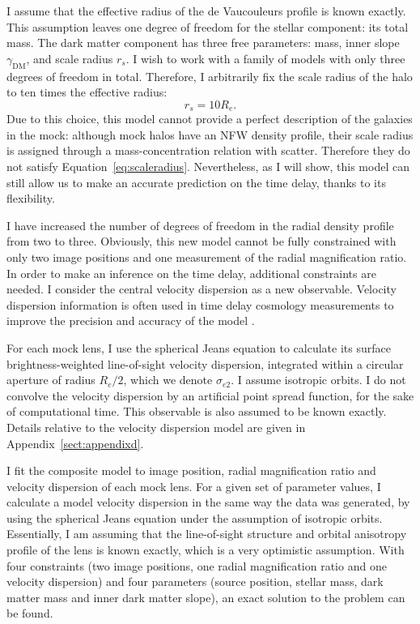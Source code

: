 \documentclass[usenatbib]{mnras}
\def\reff{R_e}
\def\sigmae{\sigma_{e2}}
\def\gammadm{\gamma_{\mathrm{DM}}}
\def\Eref#1{Equation~\ref{#1}\xspace}
\begin{document}
I assume that the effective radius of the de Vaucouleurs profile is known exactly.
This assumption leaves one degree of freedom for the stellar component: its total mass.
The dark matter component has three free parameters: mass, inner slope $\gammadm$, and scale radius $r_s$.
I wish to work with a family of models with only three degrees of freedom in total.
Therefore, I arbitrarily fix the scale radius of the halo to ten times the effective radius:
\begin{equation}\label{eq:scaleradius}
r_s = 10 \reff.
\end{equation}
Due to this choice, this model cannot provide a perfect description of the galaxies in the mock: although mock halos have an NFW density profile, their scale radius is assigned through a mass-concentration relation with scatter. Therefore they do not satisfy \Eref{eq:scaleradius}.
Nevertheless, as I will show, this model can still allow us to make an accurate prediction on the time delay, thanks to its flexibility.

I have increased the number of degrees of freedom in the radial density profile from two to three.
Obviously, this new model cannot be fully constrained with only two image positions and one measurement of the radial magnification ratio.
In order to make an inference on the time delay, additional constraints are needed.
I consider the central velocity dispersion as a new observable.
Velocity dispersion information is often used in time delay cosmology measurements to improve the precision and accuracy of the model \citep{Suy++14,Won++17}.

For each mock lens, I use the spherical Jeans equation to calculate its surface brightness-weighted line-of-sight velocity dispersion, integrated within a circular aperture of radius $\reff/2$, which we denote $\sigmae$. I assume isotropic orbits. I do not convolve the velocity dispersion by an artificial point spread function, for the sake of computational time.
This observable is also assumed to be known exactly. Details relative to the velocity dispersion model are given in Appendix~\ref{sect:appendixd}.

I fit the composite model to image position, radial magnification ratio and velocity dispersion of each mock lens. For a given set of parameter values, I calculate a model velocity dispersion in the same way the data was generated, by using the spherical Jeans equation under the assumption of isotropic orbits. Essentially, I am assuming that the line-of-sight structure and orbital anisotropy profile of the lens is known exactly, which is a very optimistic assumption.
With four constraints (two image positions, one radial magnification ratio and one velocity dispersion) and four parameters (source position, stellar mass, dark matter mass and inner dark matter slope), an exact solution to the problem can be found.
\end{document}
